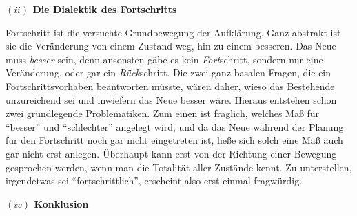 \documentclass[a4paper, 12pt]{article}
\begin{document}
\begin{onehalfspace}
\vspace{5mm}
\noindent\textbf{$(ii)$ Die Dialektik des Fortschritts}

\noindent Fortschritt ist die versuchte Grundbewegung der Aufklärung. Ganz abstrakt ist sie die Veränderung von einem Zustand weg, hin zu einem besseren. Das Neue muss \emph{besser} sein, denn ansonsten gäbe es kein \emph{Fort}schritt, sondern nur eine Veränderung, oder gar ein \emph{Rück}schritt. Die zwei ganz basalen Fragen, die ein Fortschrittsvorhaben beantworten müsste, wären daher, wieso das Bestehende unzureichend sei und inwiefern das Neue besser wäre. Hieraus entstehen schon zwei grundlegende Problematiken. Zum einen ist fraglich, welches Maß für "`besser"' und "`schlechter"' angelegt wird, und da das Neue während der Planung für den Fortschritt noch gar nicht eingetreten ist, ließe sich solch eine Maß auch gar nicht erst anlegen. Überhaupt kann erst von der Richtung einer Bewegung gesprochen werden, wenn man die Totalität aller Zustände kennt. Zu unterstellen, irgendetwas sei "`fortschrittlich"', erscheint also erst einmal fragwürdig.  



\vspace{5mm}
%
%
\noindent\textbf{$(iv)$ Konklusion}


\end{onehalfspace}
\end{document}
